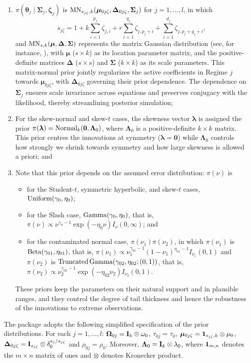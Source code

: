 \begin{enumerate}
    \item[(5)] $\pi(\bm{\theta}_j\mid\bm{\Sigma}_j,\bm{\zeta}_j)$ is 
${\rm MN}_{s_{j\zeta},k}(\bm{\mu}_{0j\zeta},\bm{\Delta}_{0j\zeta},\bm{\Sigma}_j)$ 
for $j=1,\ldots,l$, in which 
\[
s_{j\zeta}
= 1 
  + k\sum_{i=1}^{p_j}\zeta_{j,i} 
  + r\sum_{i=1}^{q_j}\zeta_{j,p_j+i}
  + \sum_{i=1}^{d_j}\zeta_{j,p_j+q_j+i},
\]
and ${\rm MN}_{s,k}(\bm{\mu},\bm{\Delta},\bm{\Sigma})$ represents the matrix Gaussian 
distribution (see, for instance, \citet[Chapter~2]{GN99}), with $\bm{\mu}$ ($s\times k$) 
as its location parameter matrix, and the positive-definite matrices 
$\bm{\Delta}$ ($s\times s$) and $\bm{\Sigma}$ ($k\times k$) as its scale parameters. 
This matrix-normal prior jointly regularizes the active coefficients in Regime $j$ 
towards $\bm{\mu}_{0j\zeta}$, with $\bm{\Delta}_{0j\zeta}$ governing their prior 
dependence. The dependence on $\bm{\Sigma}_j$ ensures scale invariance across equations and preserves conjugacy with the likelihood, thereby streamlining posterior simulation;
    \item[(6)] For the skew-normal and skew-$t$ cases, the skewness vector 
$\bm{\lambda}$ is assigned the prior
$\pi(\bm{\lambda}) = {\rm Normal}_k(\boldsymbol{0},\boldsymbol{\Lambda}_0)$, 
where $\bm{\Lambda}_0$ is a positive-definite $k\times k$ matrix. 
This prior centres the innovations at symmetry ($\bm{\lambda}=\bm{0}$) 
while $\bm{\Lambda}_0$ controls how strongly we shrink towards symmetry and 
how large skewness is allowed a priori; and
    \item[(7)] Note that this prior depends on the assumed error distribution: 
$\pi(\nu)$ is
\begin{itemize}
\item for the Student-$t$, symmetric hyperbolic, and skew-$t$ cases, ${\rm Uniform}(\gamma_{0},\eta_{0})$;
\item for the Slash case, ${\rm Gamma}(\gamma_{0},\eta_{0})$, that is, 
      $\pi(\nu)\propto\nu^{\gamma_{0}-1}\exp(-\eta_{0}\nu)I_{\nu}(0,\infty)$; and
\item for the contaminated normal case, $\pi(\nu_1)\pi(\nu_2)$, in which $\pi(\nu_1)$ is 
      ${\rm Beta}(\gamma_{01},\eta_{01})$, that is, 
      $\pi(\nu_1)\propto \nu_1^{\gamma_{01}-1}(1-\nu_1)^{\eta_{01}-1}I_{\nu_1}(0,1)$ 
      and $\pi(\nu_2)$ is 
      $\text{Truncated\,Gamma}(\gamma_{02},\eta_{02};(0,1))$, that is, 
      $\pi(\nu_2)\propto\nu_2^{\gamma_{02}-1}\exp(-\eta_{02}\nu_2)I_{\nu_2}(0,1)$.
\end{itemize}
These priors keep the parameters on their 
natural support and in plausible ranges, and they control the degree of tail thickness 
and hence the robustness of the innovations to extreme observations.
\end{enumerate}
The package  adopts the following simplified specification of the prior distributions. For each $j=1,\ldots,l$: $\bm{\Omega}_{0j}={\bf I}_{k}\otimes\omega_0$, $\tau_{0j}=\tau_{0}$, $\bm{\mu}_{0j\zeta}={\bf 1}_{s_{j\zeta},k}\otimes \mu_0$, $\bm{\Delta}_{0j\zeta}={\bf I}_{s_{j\zeta}}\otimes\delta_{0}^{s_j/s_{j\zeta}}$ and $\rho_{0j}=\rho_0$. Moreover, $\bm{\Lambda}_0={\bf I}_{k}\otimes\lambda_{0}$, where ${\bf 1}_{m,n}$ denotes the $m\times n$ matrix of ones and $\otimes$ denotes Kronecker product. 

